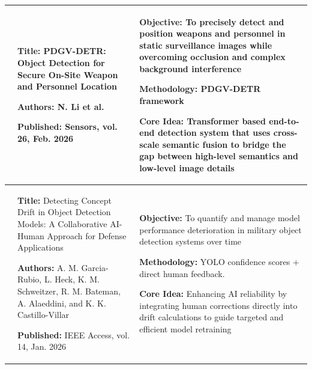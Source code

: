 \begin{center}
\begin{longtable}{
        |>{\centering\arraybackslash}m{1.22cm}
        |>{\raggedright\arraybackslash}m{6.3cm}
        |>{\raggedright\arraybackslash}m{6.3cm}|
        }
        4                                                                                            &
        \textbf{Title:} PDGV-DETR: Object Detection for Secure On-Site Weapon and Personnel Location \par
        \textbf{Authors:} N. Li et al. \par
        \textbf{Published:} Sensors,
        vol. 26, Feb. 2026                                                                           &
        \textbf{Objective:} To precisely detect and position weapons and personnel in static surveillance images while overcoming occlusion and complex background interference \par
        \textbf{Methodology:} PDGV-DETR framework \par
        \textbf{Core Idea:} Transformer based end-to-end detection system that uses cross-scale semantic fusion to bridge the gap between high-level semantics and low-level image details \\
        \hline

        5                                                                                            &
        \textbf{Title:} Detecting Concept Drift in Object Detection Models: A Collaborative AI-Human Approach for Defense Applications \par
        \textbf{Authors:} A. M. Garcia-Rubio, L. Heck, K. M. Schweitzer, R. M. Bateman, A. Alaeddini, and
        K. K. Castillo-Villar \par
        \textbf{Published:} IEEE Access, vol. 14, Jan. 2026                                          &
        \textbf{Objective:} To quantify and manage model performance deterioration in military object detection systems over time \par
        \textbf{Methodology:} YOLO confidence scores + direct human feedback.\par
        \textbf{Core Idea:} Enhancing AI reliability by integrating human corrections directly into drift calculations to guide targeted and efficient model retraining                    \\
        \hline


\end{longtable}
\end{center}
